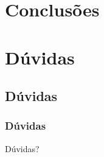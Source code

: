 \documentclass{beamer}
\begin{document}
\subsection{}
\begin{frame}
    \frametitle{}

    
\end{frame}

\section{Conclusões}
\subsection{}
\begin{frame}
    \frametitle{}

    
\end{frame}

\section*{Dúvidas}
\subsection*{Dúvidas}
\begin{frame}
    \frametitle{Dúvidas}

    \Huge Dúvidas?
\end{frame}
\end{document}
